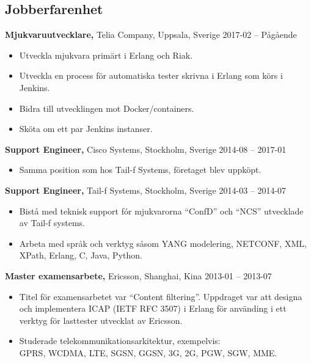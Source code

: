 \documentclass[margin]{res}
\begin{document}

\address{{\bf Kontaktinformation}\\
  
  linkedin.com/in/tommymattsson \\
  github.com/Taddic
}

\address{{\bf Adress}\\
  \\
}

\begin{resume}

\section{Jobberfarenhet}
{\bf Mjukvaruutvecklare,} Telia Company, Uppsala, Sverige \hfill 2017-02 -- Pågående
 \begin{itemize} \itemsep -2pt  %
 \item Utveckla mjukvara primärt i Erlang och Riak.
 \item Utveckla en process för automatiska tester skrivna i Erlang som körs i Jenkins.
 \item Bidra till utvecklingen mot Docker/containers.
 \item Sköta om ett par Jenkins instanser.
 \end{itemize}

{\bf Support Engineer,} Cisco Systems, Stockholm, Sverige \hfill 2014-08 -- 2017-01
 \begin{itemize} \itemsep -2pt  %
 \item Samma position som hos Tail-f Systems, företaget blev uppköpt.
 \end{itemize}

{\bf Support Engineer,} Tail-f Systems, Stockholm, Sverige \hfill 2014-03 -- 2014-07
 \begin{itemize} \itemsep -2pt  %
 \item Bistå med teknisk support fór mjukvarorna ``ConfD'' och ``NCS''
   utvecklade av Tail-f systems.
 \item Arbeta med språk och verktyg såsom YANG modelering, NETCONF,
   XML, XPath, Erlang, C, Java, Python.
 \end{itemize}

{\bf Master examensarbete,} Ericsson, Shanghai, Kina \hfill 2013-01 -- 2013-07
 \begin{itemize} \itemsep -2pt  %
 \item Titel för examensarbetet var ``Content filtering''. Uppdraget var
   att designa och implementera ICAP (IETF RFC 3507) i Erlang för
   använding i ett verktyg för lasttester utvecklat av Ericsson.
 \item Studerade telekommunikationsarkitektur, exempelvis: \\
 GPRS, WCDMA, LTE, SGSN, GGSN, 3G, 2G, PGW, SGW, MME.
 \end{itemize}


\end{resume}
\end{document}
